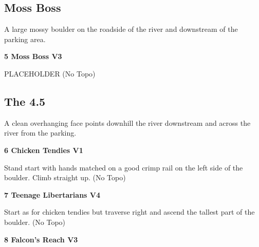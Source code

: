 \begin{multicols}{2}
\begin{minipage}{\columnwidth}
			\subsection*{Moss Boss}\label{bf:Moss Boss}
			A large mossy boulder on the roadside of the river and downstream of the parking area.
			
			\end{minipage}
			
					\begin{minipage}{\linewidth}	
					\label{rt:Moss Boss}
\colorbox{green!20}{
\parbox{0.95\textwidth}{
\textbf{
5 Moss Boss V3   
}
}
}

					\begin{adjustwidth}{0.5cm}{}				
					PLACEHOLDER
						\newline (No Topo) 
					\end{adjustwidth}
					\end{minipage}
			\begin{minipage}{\columnwidth}
			\subsection*{The 4.5}\label{bf:The 4.5}
			A clean overhanging face points downhill the river downstream and across the river from the parking.
			
			\end{minipage}
			
					\begin{minipage}{\linewidth}	
					\label{rt:Chicken Tendies}
\colorbox{green!20}{
\parbox{0.95\textwidth}{
\textbf{
6 Chicken Tendies V1   
}
}
}

					\begin{adjustwidth}{0.5cm}{}				
					Stand start with hands matched on a good crimp rail on the left side of the boulder. Climb straight up.
						\newline (No Topo) 
					\end{adjustwidth}
					\end{minipage}
					\begin{minipage}{\linewidth}	
					\label{rt:Teenage Libertarians}
\colorbox{RoyalBlue!20}{
\parbox{0.95\textwidth}{
\textbf{
7 Teenage Libertarians V4     
}
}
}

					\begin{adjustwidth}{0.5cm}{}				
					Start as for chicken tendies but traverse right and ascend the tallest part of the boulder.
						\newline (No Topo) 
					\end{adjustwidth}
					\end{minipage}
					\begin{minipage}{\linewidth}	
					\label{rt:Falcon's Reach}
\colorbox{green!20}{
\parbox{0.95\textwidth}{
\textbf{
8 Falcon's Reach V3   
}
}
}


\end{minipage}
\end{multicols}
